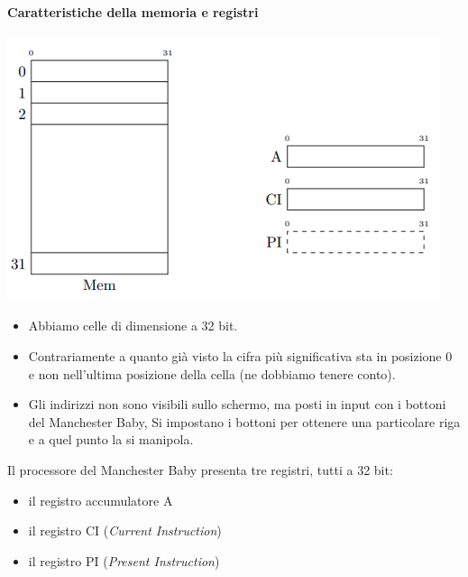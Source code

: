 \paragraph{Caratteristiche della memoria e registri}
\begin{center}
	\includegraphics{img/4.PNG}
\end{center}
\begin{itemize}
	\item Abbiamo celle di dimensione a 32 bit. 
	\item Contrariamente a quanto già visto la cifra più significativa sta in posizione 0 e non nell'ultima posizione della cella (ne dobbiamo tenere conto).
	\item Gli indirizzi non sono visibili sullo schermo, ma posti in input con i bottoni del Manchester Baby, Si impostano i bottoni per ottenere una particolare riga e a quel punto la si manipola.
\end{itemize}
Il processore del Manchester Baby presenta tre registri, tutti a 32 bit:
\begin{itemize}
	\item il registro accumulatore A
	\item il registro CI (\emph{Current Instruction})
	\item il registro PI (\emph{Present Instruction})
\end{itemize}

